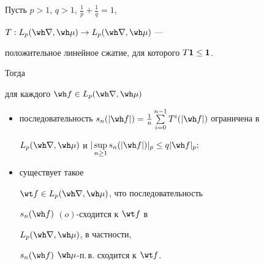  


\begin{thm} 


Пусть $p>1$, $q>1$, $\frac{1}{p}+\frac{1}{q}=1$, 


$T:L_p(\wh\nabla,\wh\mu)\to L_p(\wh\nabla,\wh\mu)$ --- 


положительное линейное сжатие, для которого $T\bold 1\le \bold 1$. 


Тогда 


для каждого $\wh f\in L_p(\wh\nabla,\wh\mu)$ 


\begin{itemize} 


\item[1)] последовательность $s_n(|\wh 


f|)=\frac{1}{n}\sum\limits^{n-1}_{i=0}T^i(|\wh f|)$ ограничена в 


$L_p(\wh\nabla,\wh\mu)$ и $|\sup\limits_{n\ge1}s_n(|\wh f|)|_p\le q|\wh 


f|_p;$ 


\item[2)] существует такое 


$\wt f\in L_p(\wh\nabla,\wh\mu)$, что последовательность 


$s_n(\wh f)$\; $(o)$-сходится к $\wt f$ в 


$L_p(\wh\nabla,\wh\mu)$, в частности, 


$s_n(\wh f)$\; $\wh\mu$-п.\,в. сходится к $\wt f$. 


\end{itemize} 


\end{thm} 


 


